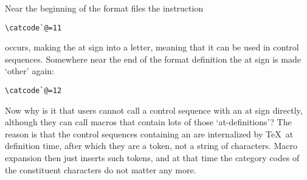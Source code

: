 \documentclass{book}
\begin{document}
Near the beginning of the format files the instruction
\begin{verbatim}
\catcode`@=11
\end{verbatim}
occurs, making the at sign into a letter,
meaning that it can be used in control sequences. Somewhere near the
end of the format definition the at sign is made `other' again:
\begin{verbatim}
\catcode`@=12
\end{verbatim}

Now why is it that users cannot
call a control sequence with an at sign
directly, although they can call macros that contain lots of those
`at-definitions'? The reason is that the control sequences
containing an \n@ are internalized by \TeX\ at definition time,
after which they are a token, not a string of characters. 
Macro expansion then
just inserts such tokens, and at that time the category codes
of the constituent characters do not matter any more.

\endofchapter
\end{document}
